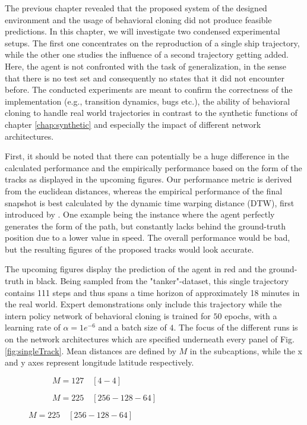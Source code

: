 The previous chapter revealed that the proposed system of the designed environment and the usage of behavioral cloning did not produce feasible predictions. In this chapter, we will investigate two condensed experimental setups. The first one concentrates on the reproduction of a single ship trajectory, while the other one studies the influence of a second trajectory getting added. Here, the agent is not confronted with the task of generalization, in the sense that there is no test set and consequently no states that it did not encounter before. The conducted experiments are meant to confirm the correctness of the implementation (e.g., transition dynamics, bugs etc.), the ability of behavioral cloning to handle real world trajectories in contrast to the synthetic functions of chapter \ref{chap:synthetic} and especially the impact of different network architectures.
\par
First, it should be noted that there can potentially be a huge difference in the calculated performance and the empirically performance based on the form of the tracks as displayed in the upcoming figures. Our performance metric is derived from the euclidean distances, whereas the empirical performance of the final snapshot is best calculated by the dynamic time warping distance (DTW), first introduced by \cite{1104847}. One example being the instance where the agent perfectly generates the form of the path, but constantly lacks behind the ground-truth position due to a lower value in speed. The overall performance would be bad, but the resulting figures of the proposed tracks would look accurate.
\par
The upcoming figures display the prediction of the agent in red and the ground-truth in black. Being sampled from the "tanker"-dataset, this single trajectory contains 111 steps and thus spans a time horizon of approximately 18 minutes in the real world. Expert demonstrations only include this trajectory while the intern policy network of behavioral cloning is trained for $50$ epochs, with a learning rate of $\alpha = 1e^{-6}$ and a batch size of $4$. The focus of the different runs is on the network architectures which are specified underneath every panel of Fig. \ref{fig:singleTrack}. Mean distances are defined by $M$ in the subcaptions, while the x and y axes represent longitude latitude respectively.
\begin{figure}[H]
     \centering
     \begin{subfigure}[b]{0.48\textwidth}
         \centering
       
         \caption{$M=127 \quad [4-4]$}
         \label{fig:single1}
     \end{subfigure}
     \hfill
     \begin{subfigure}[b]{0.48\textwidth}
         \centering
             
         \caption{$M=225 \quad [256-128-64]$}
         \label{fig:single2}
     \end{subfigure}
\end{figure}
